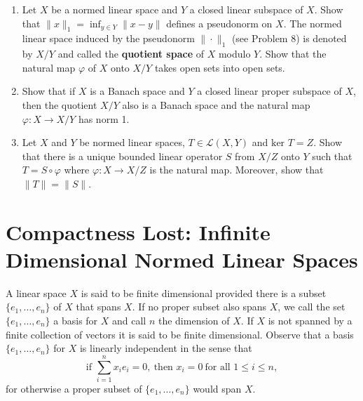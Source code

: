 \begin{enumerate}
    \item Let $X$ be a normed linear space and $Y$ a closed linear subspace of $X$.
    Show that $\|x\|_1=\inf_{y\in Y}\|x-y\|$ defines a pseudonorm on $X$.
    The normed linear space induced by the pseudonorm $\|\cdot\|_1$ (see Problem 8) is denoted by $X/Y$ and called the \textbf{quotient space} of $X$ modulo $Y$.
    Show that the natural map $\varphi$ of $X$ onto $X/Y$ takes open sets into open sets.
    \item Show that if $X$ is a Banach space and $Y$ a closed linear proper subspace of $X$, then the quotient $X/Y$ also is a Banach space and the natural map $\varphi:X\to X/Y$ has norm 1.
    \item Let $X$ and $Y$ be normed linear spaces, $T\in\mathcal{L}(X,Y)$ and $\text{ker }T=Z$.
    Show that there is a unique bounded linear operator $S$ from $X/Z$ onto $Y$ such that $T=S\circ\varphi$ where $\varphi:X\to X/Z$ is the natural map.
    Moreover, show that $\|T\|=\|S\|$.
\end{enumerate}

\section{Compactness Lost: Infinite Dimensional Normed Linear Spaces}

A linear space $X$ is said to be finite dimensional provided there is a subset $\{e_1,\dots,e_n\}$ of $X$ that spans $X$.
If no proper subset also spans $X$, we call the set $\{e_1,\dots,e_n\}$ a basis for $X$ and call $n$ the dimension of $X$.
If $X$ is not spanned by a finite collection of vectors it is said to be finite dimensional.
Observe that a basis $\{e_1,\dots,e_n\}$ for $X$ is linearly independent in the sense that 
\[
    \text{if }\sum_{i=1}^nx_ie_i=0,\ \text{then }x_i=0\ \text{for all }1\le i\le n,
\]
for otherwise a proper subset of $\{e_1,\dots,e_n\}$ would span $X$.

